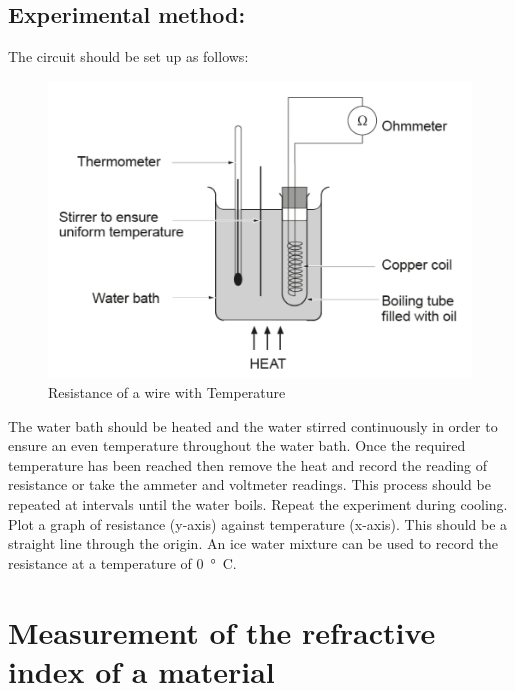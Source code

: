 \documentclass{tufte-handout}
\begin{document}
\subsection{Experimental method:}
The circuit should be set up as follows:  
\begin{figure}
\includegraphics[width=\textwidth]{restemp.PNG}
\caption{Resistance of a wire with Temperature}
\end{figure}
The water bath should be heated and the water stirred continuously in order to ensure an even temperature throughout the water bath.  Once the required temperature has been reached then remove the heat and record the reading of resistance or take the ammeter and voltmeter readings. This process should be repeated at intervals until the water boils.  
Repeat the experiment during cooling. Plot a graph of resistance (y-axis) against temperature (x-axis). This should be a straight line through the origin.  
An ice water mixture can be used to record the resistance at a temperature of \SI{0}{\degree C}. 
\section{Measurement of the refractive index of a material}
\end{document}
